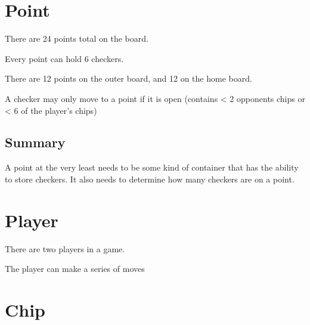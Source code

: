 \documentclass{report}
\begin{document}
\section{Point}

\begin{dashed}
    \item There are 24 points total on the board.
    \item Every point can hold 6 checkers.
    \item There are 12 points on the outer board, and 12 on the home board.
    \item A checker may only move to a point if it is open (contains < 2 opponents chips
        or < 6 of the player's chips)
\end{dashed}

\subsection{Summary}

A point at the very least needs to be some kind of container that has the ability
to store checkers. It also needs to determine how many checkers are on a point.

\section{Player}

\begin{dashed}
    \item There are two players in a game.
    \item The player can make a series of moves
\end{dashed}

\section{Chip}
\end{document}
